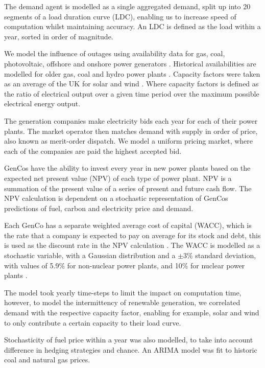 The demand agent is modelled as a single aggregated demand, split up into 20 segments of a load duration curve (LDC), enabling us to increase speed of computation whilst maintaining accuracy. An LDC is defined as the load within a year, sorted in order of magnitude. 

We model the influence of outages using availability data for gas, coal, photovoltaic, offshore and onshore power generators \cite{Ltd2016, Hunt2015, carroll-j}. Historical availabilities are modelled for older gas, coal and hydro power plants \cite{AlbertaSystemElectricOperator2016}. Capacity factors were taken as an average of the UK for solar and wind \cite{Pfenninger2016, Staffell2016}. Where capacity factors is defined as the ratio of electrical output over a given time period over the maximum possible electrical energy output. 

The generation companies make electricity bids each year for each of their power plants. The market operator then matches demand with supply in order of price, also known as merit-order dispatch. We model a uniform pricing market, where each of the companies are paid the highest accepted bid.

GenCos have the ability to invest every year in new power plants based on the expected net present value (NPV) of each type of power plant. NPV is a summation of the present value of a series of present and future cash flow. The NPV calculation is dependent on a stochastic representation of GenCos predictions of fuel, carbon and electricity price and demand.

Each GenCo has a separate weighted average cost of capital (WACC), which is the rate that a company is expected to pay on average for its stock and debt, this is used as the discount rate in the NPV calculation \cite{KincheloeStephenC1990TWAC}. The WACC is modelled as a stochastic variable, with a Gaussian distribution and a $\pm3\%$ standard deviation, with values of 5.9\% for non-nuclear power plants, and 10\% for nuclear power plants \cite{KPMG2017, Paper2012}. 

The model took yearly time-steps to limit the impact on computation time, however, to model the intermittency of renewable generation, we correlated demand with the respective capacity factor, enabling for example, solar and wind to only contribute a certain capacity to their load curve.

Stochasticity of fuel price within a year was also modelled, to take into account difference in hedging strategies and chance. An ARIMA model \cite{ARIMA} was fit to historic coal and natural gas prices.



